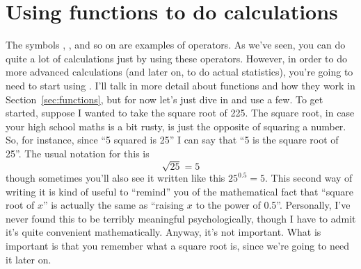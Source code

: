 \section{Using functions to do calculations\label{sec:usingfunctions}}

The symbols \rtext{+}, \rtext{-}, \rtext{*} and so on are examples of operators. As we've seen, you can do quite a lot of calculations just by using these operators. However, in order to do more advanced calculations (and later on, to do actual statistics), you're going to need to start using . I'll talk in more detail about functions and how they work in Section~\ref{sec:functions}, but for now let's just dive in and use a few. To get started, suppose I wanted to take the square root of 225. The  square root, in case your high school maths is a bit rusty, is just the opposite of squaring a number. So, for instance, since ``5 squared is 25'' I can say that ``5 is the square root of 25''. The usual notation for this is 
$$
\sqrt{25} = 5
$$
though sometimes you'll also see it written like this
$
25^{0.5} = 5.
$
This second way of writing it is kind of useful to ``remind'' you of the mathematical fact that ``square root of $x$'' is actually the same as ``raising $x$ to the power of 0.5''. Personally, I've never found this to be terribly meaningful psychologically, though I have to admit it's quite convenient mathematically. Anyway, it's not important. What is important is that you remember what a square root is, since we're going to need it later on.

